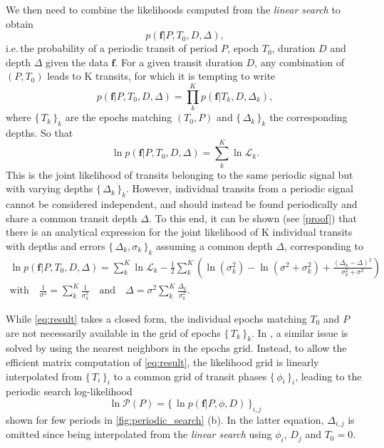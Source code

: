 \documentclass[modern]{aastex631}
\newcommand{\set}[1]{\{\,#1\,\}}
\begin{document}
We then need to combine the likelihoods computed from the \textit{linear search} to obtain
\begin{equation*}
    p(\bm{f} \vert P, T_0 , D, \Delta),
\end{equation*}
i.e.\,the probability of a periodic transit of period $P$, epoch $T_0$, duration $D$ and depth $\Delta$ given the data $\bm{f}$. For a given transit duration $D$, any combination of $(P, T_0)$ leads to K transits, for which it is tempting to write
\begin{equation}\label{eq:attempt}
    p(\bm{f} \vert P, T_0 ,D, \Delta) = \prod_k^K p(\bm{f} \vert T_k, D, \Delta_k),
\end{equation}
where $\set{T_k}_k$ are the epochs matching $(T_0, P)$ and $\set{\Delta_k}_k$ the corresponding depths. So that
\begin{equation*}
    \ln p(\bm{f} \vert P, T_0 ,D, \Delta) = \sum_k^K \ln \mathcal{L}_k.
\end{equation*}
This is the joint likelihood of transits belonging to the same periodic signal but with varying depths  $\set{\Delta_k}_k$. However, individual transits from a periodic signal cannot be considered independent, and should instead be found periodically and share a common transit depth $\Delta$. To this end, it can be shown (see \autoref{proof}) that there is an analytical expression for the joint likelihood of K individual transits with depths and errors $\set{\Delta_k, \sigma_k}_k$ assuming a common depth $\Delta$, corresponding to 
\begin{equation}\label{eq:result}
    \begin{gathered}
        \ln p(\bm{f} \vert P, T_0 ,D, \Delta) =  \sum_{k}^K \ln \mathcal{L}_k  - \frac{1}{2} \sum_k^K\left(\ln(\sigma_{k}^2) - \ln(\sigma^{2} + \sigma_{k}^{2}) +  \frac{\left(\Delta_{k} -
        \Delta\right)^{2}}{\sigma_k^{2} + \sigma^{2}}\right) \\
        \text{with} \quad  \frac{1}{\sigma^2} = \sum_k^K \frac{1}{\sigma_k^2} \quad \text{and} \quad
        \Delta = \sigma^2 \sum_k^K {\frac{\Delta_k}{\sigma_k^2}}.
    \end{gathered}
\end{equation}

While \autoref{eq:result} takes a closed form, the individual epochs matching $T_0$ and $P$ are not necessarily available in the grid of epochs $\set{T_k}_k$. In \cite{foreman2016}, a similar issue is solved by using the nearest neighbors in the epochs grid. Instead, to allow the efficient matrix computation of \autoref{eq:result}, the likelihood grid is linearly interpolated from $\set{T_i}_i$ to a common grid of transit phases $\set{\phi_i}_i$, leading to the periodic search log-likelihood
$$\ln\mathcal{P}(P) = \set{\ln p(\bm{f} \vert P, \phi, D)}_{i,j}$$
shown for few periods in \autoref{fig:periodic_search} (b). In the latter equation, $\Delta_{i,j}$ is omitted since being interpolated from the \textit{linear search} using $\phi_i$, $D_j$ and $T_0 = 0$.
\end{document}
